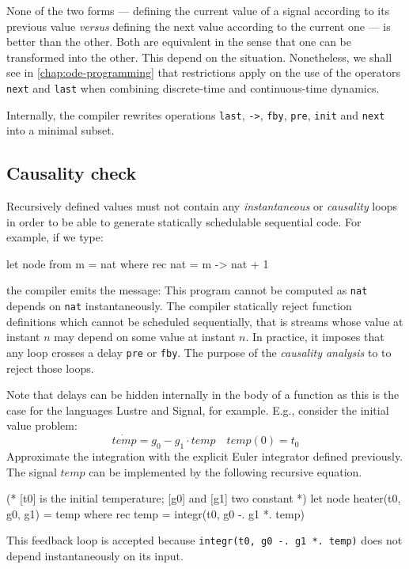 \documentclass[11pt,titlepage,twoside]{report}
\newcommand{\lustre}{{\sf Lustre}}
\newcommand{\signal}{{\sf Signal}}
\newcommand{\Remark}{\medskip\noindent{\bf Remark: }}
\begin{document}
None of the two forms --- defining the current value of a signal
according to its previous value \emph{versus} defining the next value
according to the current one --- is better than the other. Both are
equivalent in the sense that one can be transformed into the
other. This depend on the situation. Nonetheless, we shall see in
\cref{chap:ode-programming} that restrictions apply on the
use of the operators \texttt{next} and \texttt{last} when combining discrete-time and
continuous-time dynamics.

\Remark Internally, the compiler rewrites
operations \verb-last-, \verb+->+, \verb-fby-, \verb+pre+, \verb+init+
and \verb+next+ into a minimal subset.

\subsection{Causality check} %

\label{causality-check}
Recursively defined values must not contain any {\em instantaneous} or
{\em causality} loops in order to be able to generate statically schedulable
sequential code. For example, if we type:
\begin{runverbatim}[fail]
let node from m = nat where
  rec nat = m -> nat + 1
\end{runverbatim}
the compiler emits the message:
\runverbatimerr{}
This program cannot be computed as {\tt nat} depends on {\tt nat}
instantaneously.
The compiler statically reject function definitions which cannot be scheduled
sequentially, that is streams whose value at instant $n$ may depend on
some value at instant $n$. In practice, it imposes that any loop
crosses a delay \verb-pre- or \verb-fby-. The purpose of
the \emph{causality analysis} to to reject those loops.

\newcommand{\temp}{\mathit{temp}}

Note that delays can be hidden internally in the body of a function as
this is the case for the languages \lustre{} and \signal, for
example. E.g., consider the initial value problem:
\[
\dot{\temp} = g_0 - g_1 \cdot \temp \quad \temp(0) = t_0
\]
Approximate the integration with the explicit Euler integrator defined previously. The
signal $\temp$ can be implemented by the following recursive equation.

\begin{runverbatim}[withresult,include=integr]
(* [t0] is the initial temperature; [g0] and [g1] two constant *)
let node heater(t0, g0, g1) = temp where
  rec temp = integr(t0, g0 -. g1 *. temp)
\end{runverbatim}
This feedback loop is accepted because \verb+integr(t0, g0 -. g1 *. temp)+ does
not depend instantaneously on its input.
\end{document}
